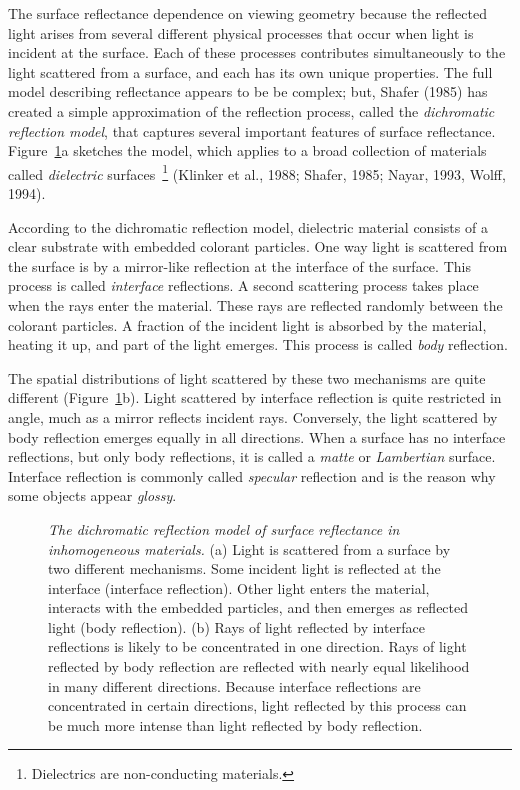 The surface reflectance dependence on viewing geometry because the
reflected light arises from several different physical processes that
occur when light is incident at the surface.  Each of these processes
contributes simultaneously to the light scattered from a surface, and
each has its own unique properties. The full model describing
reflectance appears to be be complex; but, Shafer (1985) has created a
simple approximation of the reflection process, called the {\em
dichromatic reflection model}, that captures several important
features of surface reflectance.  Figure~\ref{f8:refProcess}a sketches
the model, which applies to a broad collection of materials called
{\em dielectric} surfaces~\footnote{ Dielectrics are non-conducting
materials.}  (Klinker et al., 1988; Shafer, 1985; Nayar, 1993, Wolff,
1994).

According to the dichromatic reflection model, dielectric material
consists of a clear substrate with embedded colorant particles.  One
way light is scattered from the surface is by a mirror-like reflection
at the interface of the surface.  This process is called {\em
interface} reflections.  A second scattering process takes place when
the rays enter the material.  These rays are reflected randomly
between the colorant particles.  A fraction of the incident light is
absorbed by the material, heating it up, and part of the light
emerges.  This process is called {\em body} reflection.

The spatial distributions of light scattered by these two mechanisms
are quite different (Figure~\ref{f8:refProcess}b).  Light scattered by
interface reflection is quite restricted in angle, much as a mirror
reflects incident rays.  Conversely, the light scattered by body
reflection emerges equally in all directions.  When a surface has no
interface reflections, but only body reflections, it is called a {\em
matte} or {\em Lambertian} surface.  Interface reflection is commonly
called {\em specular} reflection and is the reason why some objects
appear {\em glossy}.
\begin{figure}
\centerline{
}
\caption[Physical Mechanisms of Reflectance]{
{\em The dichromatic reflection model of surface reflectance in
inhomogeneous materials. } (a) Light is scattered from a surface by
two different mechanisms.  Some incident light is reflected at the
interface (interface reflection).  Other light enters the material,
interacts with the embedded particles, and then emerges as reflected
light (body reflection).  (b) Rays of light reflected by interface
reflections is likely to be concentrated in one direction.  Rays of
light reflected by body reflection are reflected with nearly equal
likelihood in many different directions.  Because interface
reflections are concentrated in certain directions, light reflected by
this process can be much more intense than light reflected by body
reflection. }
\label{f8:refProcess}
\end{figure}

